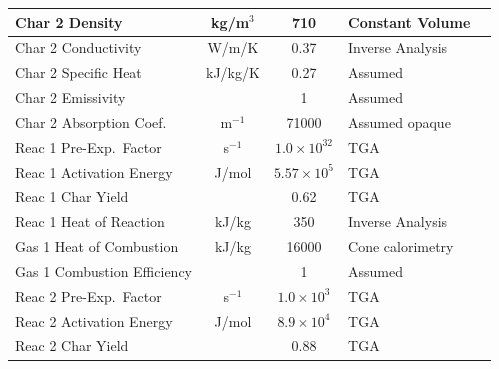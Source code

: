 \begin{table}[p]
\begin{center}
\begin{tabular}{|l|c|c|l|l|}
Char 2 Density              & kg/m$^3$      & 710                               & Constant Volume           &  \cite{Oztekin:CF2012}                  \\ \hline
Char 2 Conductivity         & W/m/K         & 0.37                              & Inverse Analysis          &  \cite{Oztekin:CF2012}                  \\ \hline
Char 2 Specific Heat        & kJ/kg/K       & 0.27                              & Assumed                   &  \cite{Oztekin:CF2012}                  \\ \hline
Char 2 Emissivity           &               & 1                                 & Assumed                   &  \cite{Oztekin:CF2012}                  \\ \hline
Char 2 Absorption Coef.     & m$^{-1}$      & 71000                             & Assumed opaque            &  \cite{Oztekin:CF2012}                  \\ \hline
Reac 1 Pre-Exp.~Factor      & s$^{-1}$      & $1.0 \times 10^{32}$              & TGA                       &  \cite{Oztekin:CF2012}                  \\ \hline
Reac 1 Activation Energy    & J/mol       & $5.57 \times 10^5$                & TGA                       &  \cite{Oztekin:CF2012}                  \\ \hline
Reac 1 Char Yield           &               & 0.62                              & TGA                       &  \cite{Oztekin:CF2012}                  \\ \hline
Reac 1 Heat of Reaction     & kJ/kg         & 350                               & Inverse Analysis          &  \cite{Oztekin:CF2012}                  \\ \hline
Gas 1 Heat of Combustion    & kJ/kg         & 16000                             & Cone calorimetry          &  \cite{Oztekin:CF2012}                  \\ \hline
Gas 1 Combustion Efficiency &               & 1                                 & Assumed                   &  \cite{Oztekin:CF2012}                  \\ \hline
Reac 2 Pre-Exp.~Factor      & s$^{-1}$      & $1.0 \times 10^3$                 & TGA                       &  \cite{Oztekin:CF2012}                  \\ \hline
Reac 2 Activation Energy    & J/mol       & $8.9 \times 10^4$                 & TGA                       &  \cite{Oztekin:CF2012}                  \\ \hline
Reac 2 Char Yield           &               & 0.88                              & TGA                       &  \cite{Oztekin:CF2012}                  \\ \hline

\end{tabular}
\end{center}
\end{table}
